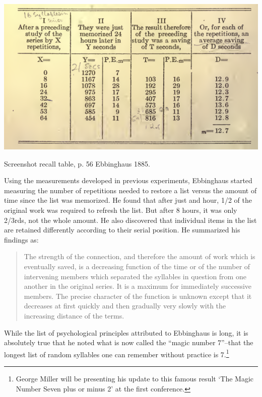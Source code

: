 \begin{refsection}
\begin{marginfigure}
\begin{center}
     \includegraphics[scale=0.5]{../images/ebbinghaus2.png}
\end{center}
 \caption{Screenshot recall table, p. 56 Ebbinghaus 1885.}
\label{fig: ebbinghaus2}
\end{marginfigure}


 Using the measurements developed in previous experiments, Ebbinghaus started measuring the number of repetitions needed to restore a list versus the amount of time since the list was memorized. He found that after just and hour, 1\slash 2 of the original work was required to refresh the list. But after 8 hours, it was only 2\slash 3rds, not the whole amount. He also discovered that individual items in the list are retained differently according to their serial position. He summarized his findings as:

\begin{quote}

The strength of the connection, and therefore the amount of work which is eventually saved, is a decreasing function of the time or of the number of intervening members which separated the syllables in question from one another in the original series. It is a maximum for immediately successive members. The precise character of the function is unknown except that it decreases at first quickly and then gradually very slowly with the increasing distance of the terms. ~\citep[p. 107]{Ebbinghaus:1885ud}
\end{quote}

While the list of psychological principles attributed to Ebbinghaus is long, it is absolutely true that he noted what is now called the “magic number 7”--that the longest list of random syllables one can remember without practice is 7.\footnote{George Miller will be presenting his update to this famous result ‘The Magic Number Seven plus or minus 2’ at the first conference.} ~\citep[p. 47]{Ebbinghaus:1885ud}


\end{refsection}
